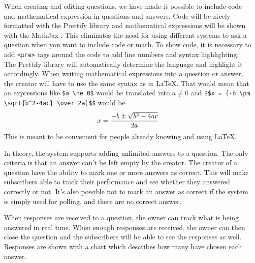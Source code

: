 When creating and editing questions, we have made it possible to include code and mathematical expression in questions and answers. Code will be nicely formatted with the Prettify library \cite{google/code-prettify_2016} and mathematical expressions will be shown with the MathJax \cite{mathjax_2016}. This eliminates the need for using different systems to ask a question when you want to include code or math. To show code, it is necessary to add \texttt{<pre>} tags around the code to add line numbers and syntax highlighting. The Prettify-library will automatically determine the language and highlight it accordingly. When writing mathematical expressions into a question or answer, the creator will have to use the same syntax as in \LaTeX. That would mean that an expressions like \verb|$a \ne 0$| would be translated into $a \ne 0$ and \verb|$$x = {-b \pm \sqrt{b^2-4ac} \over 2a}$$| would be $$x = {-b \pm \sqrt{b^2-4ac} \over 2a}$$
This is meant to be convenient for people already knowing and using \LaTeX.

In theory, the system supports adding unlimited answers to a question. The only criteria is that an answer can't be left empty by the creator. The creator of a question have the ability to mark one or more answers as correct. This will make subscribers able to track their performance and see whether they answered correctly or not. It's also possible not to mark an answer as correct if the system is simply used for polling, and there are no correct answer.

When responses are received to a question, the owner can track what is being answered in real time. When enough responses are received, the owner can then close the question and the subscribers will be able to see the responses as well. Responses are shown with a chart which describes how many have chosen each answer. 


